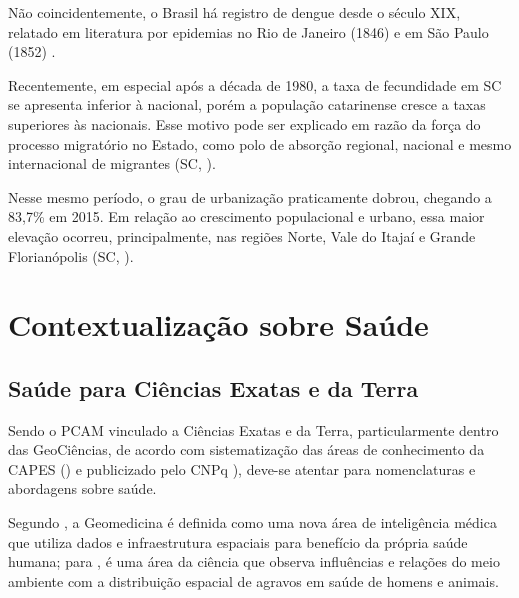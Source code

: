 \indent Não coincidentemente, o Brasil há registro de dengue desde o século XIX, relatado em literatura por epidemias no Rio de Janeiro (1846) e em São Paulo (1852) \cite{Valle2015Dengue}.

\indent Recentemente, em especial após a década de 1980, a taxa de fecundidade em \acrlong{SC} se apresenta inferior à nacional, porém a população catarinense cresce a taxas superiores às nacionais. Esse motivo pode ser explicado em razão da força do processo migratório no Estado, como polo de absorção regional, nacional e mesmo internacional de migrantes (\acrlong{SC}, \citeyear{AtlasSCpopulacao}).

\indent Nesse mesmo período, o grau de urbanização praticamente dobrou, chegando  a 83,7\% em 2015. Em relação ao crescimento populacional e urbano, essa maior elevação ocorreu,  principalmente, nas regiões Norte, Vale do Itajaí e Grande Florianópolis (\acrlong{SC}, \citeyear{AtlasSCpopulacao}). 

\section{Contextualização sobre Saúde}

\subsection{Saúde para Ciências Exatas e da Terra}

\indent Sendo o \acrfull{PCAM} vinculado a Ciências Exatas e da Terra, particularmente dentro das GeoCiências, de acordo com sistematização das áreas de conhecimento da \acrfull{CAPES} (\citeyear{CAPES_Tabela_Conhecimento}) e publicizado pelo \acrfull{CNPq} \citeyear{CNPq_Tabela_Conhecimento}), deve-se atentar para nomenclaturas e abordagens sobre saúde.

\indent Segundo , a Geomedicina é definida como uma nova área de inteligência médica que utiliza dados e infraestrutura espaciais para benefício da própria saúde humana; para , é uma área da ciência que observa influências e relações do meio ambiente com a distribuição espacial de agravos em saúde de homens e animais.

